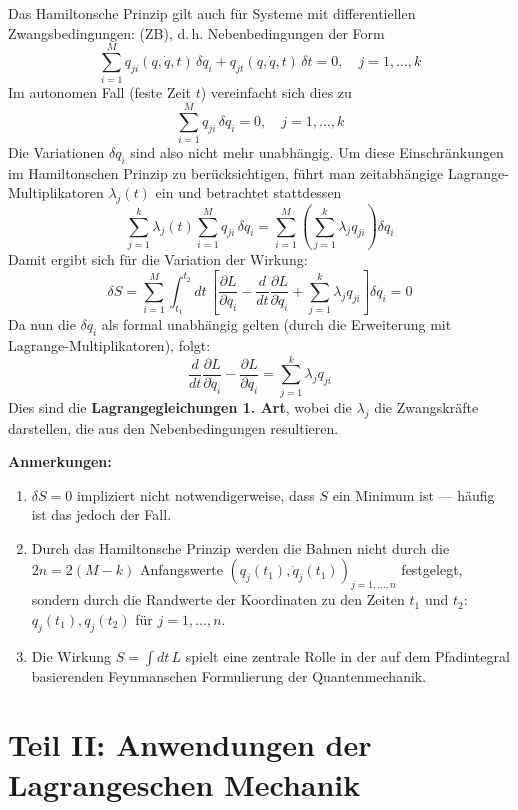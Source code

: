 \documentclass[10pt, letterpaper]{article}
\begin{document}
Das Hamiltonsche Prinzip gilt auch für Systeme mit differentiellen Zwangsbedingungen: (ZB), d.\,h. Nebenbedingungen der Form
\[
\sum_{i=1}^M q_{ji}(q,\dot{q},t)\, \delta q_i + q_{jt}(q,\dot{q},t)\, \delta t = 0, \quad j = 1,\dots,k
\]
Im autonomen Fall (feste Zeit $t$) vereinfacht sich dies zu
\[
\sum_{i=1}^M q_{ji}\, \delta q_i = 0, \quad j=1,\dots,k
\]
Die Variationen $\delta q_i$ sind also nicht mehr unabhängig. Um diese Einschränkungen im Hamiltonschen Prinzip zu berücksichtigen, führt man zeitabhängige Lagrange-Multiplikatoren $\lambda_j(t)$ ein und betrachtet stattdessen
\[
\sum_{j=1}^k \lambda_j(t) \sum_{i=1}^M q_{ji}\, \delta q_i = \sum_{i=1}^M \left( \sum_{j=1}^k \lambda_j q_{ji} \right)\delta q_i
\]
Damit ergibt sich für die Variation der Wirkung:
\[
\delta S = \sum_{i=1}^M \int_{t_1}^{t_2} dt\, \left[ \frac{\partial L}{\partial q_i} - \frac{d}{dt} \frac{\partial L}{\partial \dot{q}_i} + \sum_{j=1}^k \lambda_j q_{ji} \right] \delta q_i = 0
\]
Da nun die $\delta q_i$ als formal unabhängig gelten (durch die Erweiterung mit Lagrange-Multiplikatoren), folgt:
\[
\frac{d}{dt} \frac{\partial L}{\partial \dot{q}_i} - \frac{\partial L}{\partial q_i} = \sum_{j=1}^k \lambda_j q_{ji}
\]
Dies sind die \textbf{Lagrangegleichungen 1. Art}, wobei die $\lambda_j$ die Zwangskräfte darstellen, die aus den Nebenbedingungen resultieren.





\textbf{Anmerkungen:}

\begin{enumerate}
    \item $\delta S = 0$ impliziert nicht notwendigerweise, dass $S$ ein Minimum ist — häufig ist das jedoch der Fall.
    
    \item Durch das Hamiltonsche Prinzip werden die Bahnen nicht durch die $2n = 2(M - k)$ Anfangswerte $(q_j(t_1), \dot{q}_j(t_1))_{j=1,\dots,n}$ festgelegt, sondern durch die Randwerte der Koordinaten zu den Zeiten $t_1$ und $t_2$: $q_j(t_1), q_j(t_2)$ für $j = 1,\dots,n$.
    
    \item Die Wirkung $S = \int dt\, L$ spielt eine zentrale Rolle in der auf dem Pfadintegral basierenden Feynmanschen Formulierung der Quantenmechanik.
\end{enumerate}






\pagebreak

\section{Teil II: Anwendungen der Lagrangeschen Mechanik}
\end{document}

